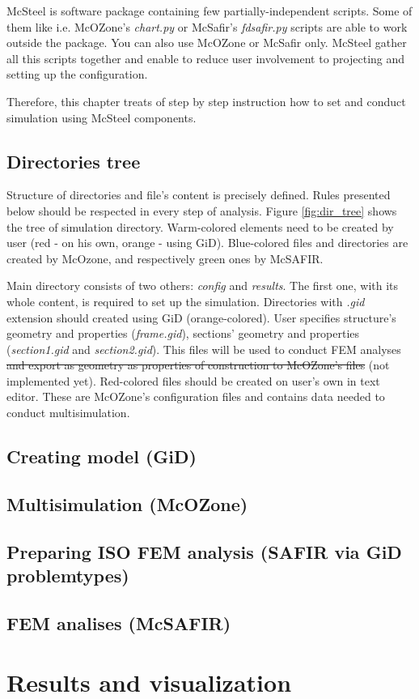 \documentclass[a4paper,11pt]{article}
\begin{document}
McSteel is software package containing few partially-independent 
scripts. Some of them like i.e. McOZone's \emph{chart.py} or McSafir's 
\emph{fdsafir.py} scripts are able to work outside the package. You can 
also use McOZone or McSafir only. McSteel gather all this scripts
together and enable to reduce user involvement to projecting and 
setting up the configuration.

Therefore, this chapter treats of step by step instruction how to set
and conduct simulation using McSteel components.

\subsection{Directories tree}


Structure of directories and file's content is precisely defined.
Rules presented below should be respected in every step of analysis.
Figure \ref{fig:dir_tree} shows the tree of simulation directory.
Warm-colored elements need to be created by user (red - on his own, 
orange - using GiD). Blue-colored files and directories are created by
McOzone, and respectively green ones by McSAFIR. 

Main directory consists of two others: \emph{config} and \emph{results}.
The first one, with its whole content, is required to set up the 
simulation. Directories with \emph{.gid} extension should created using 
GiD (orange-colored). User specifies structure's geometry and 
properties (\emph{frame.gid}), sections' geometry and properties 
(\emph{section1.gid} and \emph{section2.gid}). This files will be
used to conduct FEM analyses \sout{and export as geometry as properties 
of construction to McOZone's files} (not implemented yet).
Red-colored files should be created on user's own in text editor. These 
are McOZone's configuration files and contains data needed to conduct 
multisimulation.





\clearpage
\newpage
\subsection{Creating model (GiD)}

\newpage
\subsection{Multisimulation (McOZone)}

\newpage
\subsection{Preparing ISO FEM analysis (SAFIR via GiD problemtypes)}

\newpage
\subsection{FEM analises (McSAFIR)}

\newpage
\section{Results and visualization}
\end{document}
